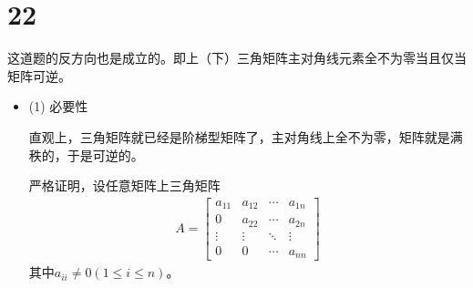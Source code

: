 \documentclass{article}
\begin{document}
\section*{22}

这道题的反方向也是成立的。即上（下）三角矩阵主对角线元素全不为零当且仅当矩阵可逆。

\begin{itemize}
  \item (1) 必要性

        直观上，三角矩阵就已经是阶梯型矩阵了，主对角线上全不为零，矩阵就是满秩的，于是可逆的。

        严格证明，设任意矩阵上三角矩阵
        \begin{align*}
          A = \begin{bmatrix}
                a_{11} & a_{12} & \cdots & a_{1n} \\
                0      & a_{22} & \cdots & a_{2n} \\
                \vdots & \vdots & \ddots & \vdots \\
                0      & 0      & \cdots & a_{nn}
              \end{bmatrix}
        \end{align*}
        其中$a_{ii} \neq 0 (1 \leq i \leq n)$。


\end{itemize}
\end{document}

